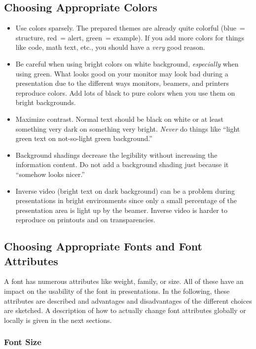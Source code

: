 \subsection{Choosing Appropriate Colors}

\begin{itemize}
\item
  Use colors sparsely. The prepared themes are already quite
  colorful (blue~= structure, red~= alert, green~= example). If you
  add more colors for things like code, math text, etc., you should
  have a \emph{very} good reason. 
\item
  Be careful when using bright colors on white background,
  \emph{especially} when using green. What looks good on your monitor
  may look bad during a presentation due to the different ways
  monitors, beamers, and printers reproduce colors. Add lots of black
  to pure colors when you use them on bright backgrounds.
\item
  Maximize contrast. Normal text should be black on white or at least
  something very dark on something very bright. \emph{Never} do things
  like ``light green text on not-so-light green background.''
\item
  Background shadings decrease the legibility without increasing the
  information content. Do not add a background shading just because it
  ``somehow looks nicer.'' 
\item
  Inverse video (bright text on dark background) can be a problem
  during presentations in bright environments since only a small
  percentage of the presentation area is light up by the
  beamer. Inverse video is harder to reproduce on printouts and on
  transparencies. 
\end{itemize}






\subsection{Choosing Appropriate Fonts and Font Attributes}

A font has numerous attributes like weight, family, or size. All of
these have an impact on the usability of the font in
presentations. In the following, these attributes are described and
advantages and disadvantages of the different choices are sketched.
A description of how to actually change font attributes globally or
locally is given in the next sections.


\subsubsection{Font Size}


